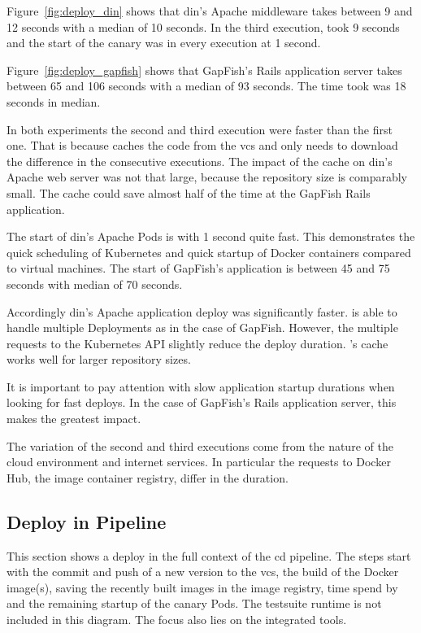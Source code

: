 Figure~\ref{fig:deploy_din} shows that \gls{din}'s Apache middleware takes between 9 and 12
seconds with a median of 10 seconds. In the third execution, \deployer{} took 9 seconds and
the start of the canary was in every execution at 1 second.

Figure~\ref{fig:deploy_gapfish} shows that GapFish's Rails application server takes
between 65 and 106 seconds with a median of 93 seconds. The time \deployer{} took was 18
seconds in median.

In both experiments the second and third execution were faster than the first one. That is
because \deployer{} caches the code from the \gls{vcs} and only needs to
download the difference in the consecutive executions. The impact of the cache on \gls{din}'s
Apache web server was not that large, because the repository size is comparably
small. The cache could save almost half of the time at the GapFish Rails
application.

The start of \gls{din}'s Apache Pods is with 1 second quite fast. This demonstrates the quick
scheduling of Kubernetes and quick startup of Docker containers compared to virtual
machines. The start of GapFish's application is between 45 and 75 seconds with median of
70 seconds.

Accordingly \gls{din}'s Apache application deploy was significantly faster. \deployer{} is able to
handle multiple Deployments as in the case of GapFish. However, the multiple requests to the
Kubernetes API slightly reduce the deploy duration. \deployer{}'s cache works well for larger repository sizes.

It is important to pay attention with slow application startup durations when looking for
fast deploys. In the case of GapFish's Rails application server, this makes the
greatest impact.

The variation of the second and third executions come from the nature of the cloud
environment and internet services. In particular the requests to Docker Hub, the image container
registry, differ in the duration.

\subsection{Deploy in Pipeline}

This section shows a deploy in the full context of the \gls{cd} pipeline. The steps start
with the commit and push of a new version to the \gls{vcs}, the build of the
Docker image(s), saving the recently built images in the image registry, time spend by
\deployer{} and the remaining startup of the canary Pods. The testsuite runtime is not
included in this diagram. The focus also lies on the integrated tools.

